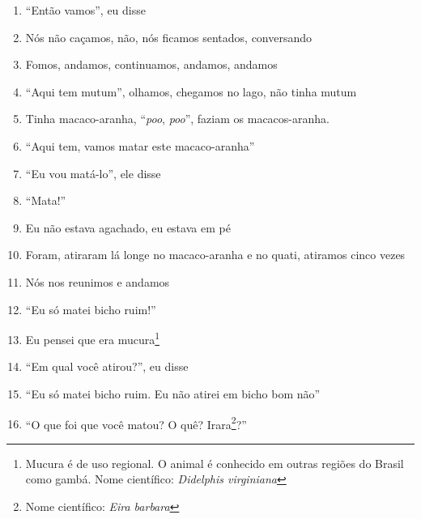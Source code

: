 \begin{enumerate}
 \item ``Então vamos'', eu disse

 \item Nós não caçamos, não, nós ficamos sentados, conversando

 \begin{center}\end{center}

 \item Fomos, andamos, continuamos, andamos, andamos

 \item ``Aqui tem mutum'', olhamos, chegamos no lago, não tinha mutum

 \item Tinha macaco-aranha, ``\textit{poo}, \textit{poo}'', faziam os
 macacos-aranha. 

 \item ``Aqui tem, vamos matar este macaco-aranha''

 \item ``Eu vou matá-lo'', ele disse

 \item ``Mata!''

 \item Eu não estava agachado, eu estava em pé

 \item Foram, atiraram lá longe no macaco-aranha e no quati, atiramos cinco
 vezes

 \item Nós nos reunimos e andamos

 \begin{center}\end{center}

 \item ``Eu só matei bicho ruim!''

 \item Eu pensei que era mucura\footnote{Mucura é de uso regional. O animal
   é conhecido em outras regiões do Brasil como gambá. Nome científico:
   \textit{Didelphis virginiana}}

 \item ``Em qual você atirou?'', eu disse

 \item ``Eu só matei bicho ruim. Eu não atirei em bicho bom não''

 \item ``O que foi que você matou? O quê? Irara\footnote{Nome científico:
   \textit{Eira barbara}}?''


\end{enumerate}
